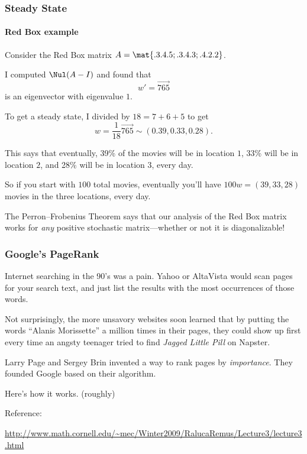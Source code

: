 \begin{frame}
\frametitle{Steady State}
\framesubtitle{Red Box example}

Consider the Red Box matrix 
$A = \mat{.3 .4 .5; .3 .4 .3; .4 .2 .2}$.\\
\begin{webonly}\displayskips{3pt}
I computed $\Nul(A-I)$ and found that 
\[ w' = \vec{7 6 5} \]
is an eigenvector with eigenvalue $1$.

\medskip
To get a steady state, I divided by $18=7+6+5$ to get
\[ w = \frac 1{18}\vec{7 6 5} \sim (0.39, 0.33, 0.28). \]
\end{webonly}%
\pause
This says that eventually, 39\% of the movies will be in location $1$, 
33\% will be in location $2$, and 28\% will be in location $3$, every day.

\pause\medskip
So if you start with $100$ total movies, eventually you'll have
$100w = (39, 33, 28)$ movies in the three locations, every day.

\pause\medskip
The Perron--Frobenius Theorem says that our analysis of the Red Box matrix works
for \emph{any} positive stochastic matrix---whether or not it is diagonalizable!

\end{frame}



\begin{frame}
\frametitle{Google's PageRank}

Internet searching in the 90's was a pain.  Yahoo or AltaVista would scan pages
for your search text, and just list the results with the most occurrences of
those words. 

\pause\medskip
Not surprisingly, the more unsavory websites soon learned that by putting the
words ``Alanis Morissette'' a million times in their pages, they could show up first 
every time an angsty teenager tried to find \textit{Jagged Little Pill\/} on Napster.

\pause\medskip
Larry Page and Sergey Brin invented a way to rank pages by \emph{importance}.
\pause
They founded Google based on their algorithm.

\pause\medskip
Here's how it works.
\pause
(roughly)

\pause\vfill
Reference:
\begin{center}
  \scriptsize
  \url{http://www.math.cornell.edu/~mec/Winter2009/RalucaRemus/Lecture3/lecture3.html}
\end{center}

\end{frame}



